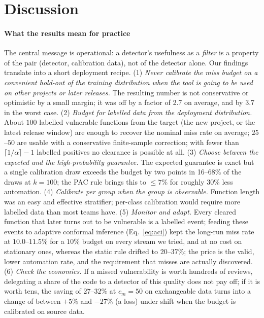 \section{Discussion}\label{sec:discussion}

\paragraph{What the results mean for practice}
The central message is operational: a detector's usefulness as a \emph{filter} is a property of the pair (detector, calibration data), not of the detector alone. Our findings translate into a short deployment recipe.
(1) \emph{Never calibrate the miss budget on a convenient hold-out of the training distribution when the tool is going to be used on other projects or later releases.} The resulting number is not conservative or optimistic by a small margin; it was off by a factor of 2.7 on average, and by 3.7 in the worst case.
(2) \emph{Budget for labelled data from the deployment distribution.} About $100$ labelled vulnerable functions from the target (the new project, or the latest release window) are enough to recover the nominal miss rate on average; $25$--$50$ are usable with a conservative finite-sample correction; with fewer than $\lceil1/\alpha\rceil-1$ labelled positives no clearance is possible at all.
(3) \emph{Choose between the expected and the high-probability guarantee.} The expected guarantee is exact but a single calibration draw exceeds the budget by two points in 16--68\% of the draws at $k=100$; the PAC rule brings this to $\le7\%$ for roughly $30\%$ less automation.
(4) \emph{Calibrate per group when the group is observable.} Function length was an easy and effective stratifier; per-class calibration would require more labelled data than most teams have.
(5) \emph{Monitor and adapt.} Every cleared function that later turns out to be vulnerable is a labelled event; feeding these events to adaptive conformal inference (Eq.~\eqref{eq:aci}) kept the long-run miss rate at $10.0$--$11.5\%$ for a $10\%$ budget on every stream we tried, and at no cost on stationary ones, whereas the static rule drifted to $20$--$37\%$; the price is the valid, lower automation rate, and the requirement that misses are actually discovered.
(6) \emph{Check the economics.} If a missed vulnerability is worth hundreds of reviews, delegating a share of the code to a detector of this quality does not pay off; if it is worth tens, the saving of $27$--$32\%$ at $c_m=50$ on exchangeable data turns into a change of between $+5\%$ and $-27\%$ (a loss) under shift when the budget is calibrated on source data.

